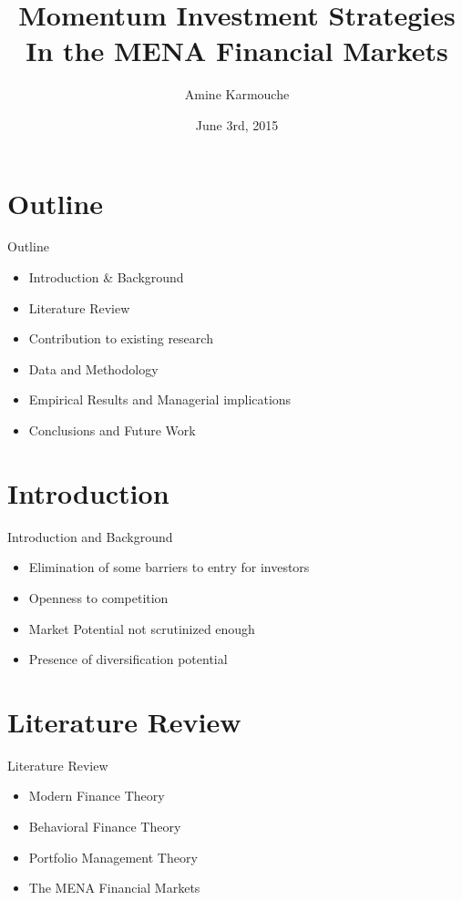 \documentclass{beamer}
\title[]{Momentum Investment Strategies In the MENA Financial Markets}
\author{Amine Karmouche}
\institute{Al Akhawayn Unievrsity in Ifrane}
\date{June 3rd, 2015}
\begin{document}
\begin{frame}
  \titlepage
\end{frame}

\section{Outline}
\begin{frame}{Outline}
	\begin{itemize}
			\item Introduction \& Background
			\item Literature Review
			\item Contribution to existing research
			\item Data and Methodology
			\item Empirical Results and Managerial implications
			\item Conclusions and Future Work
	\end{itemize}
\end{frame}

\section{Introduction}
\begin{frame}{Introduction and Background}
	\begin{itemize}
		\item Elimination of some barriers to entry for investors
		\item Openness to competition
		\item Market Potential not scrutinized enough
		\item Presence of diversification potential
	\end{itemize}
\end{frame}

\section{Literature Review}
\begin{frame}{Literature Review}
	\begin{itemize}
		\item Modern Finance Theory
		\item Behavioral Finance Theory
		\item Portfolio Management Theory
		\item The MENA Financial Markets
	\end{itemize}
\end{frame}
\end{document}
